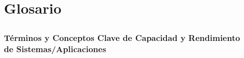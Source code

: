 \documentclass[
  paper=a4,
  ,captions=tableheading
]{scrartcl}
\renewenvironment{quote}{\begin{customblockquote}\list{}{\rightmargin=0em\leftmargin=0em}%
\item\relax\color{blockquote-text}\ignorespaces}{\unskip\unskip\endlist\end{customblockquote}}
\begin{document}
\newpage

\section{Glosario}\label{sec:glosario}

\subsection{}\label{sec:section}

\begin{quote}
\end{quote}

\subsubsection{Términos y Conceptos Clave de Capacidad y Rendimiento de
Sistemas/Aplicaciones}\label{sec:tuxe9rminos-y-conceptos-clave-de-capacidad-y-rendimiento-de-sistemasaplicaciones}
\end{document}
